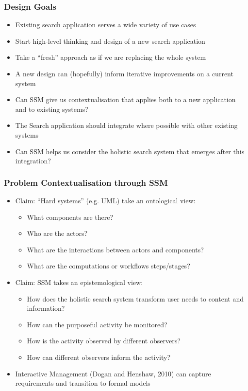 \documentclass{beamer}
\begin{document}
\begin{frame}
  \frametitle{Design Goals}
  \begin{itemize}
    \pause \item Existing search application serves a wide variety of use cases
    \pause \item Start high-level thinking and design of a new search application
    \pause \item Take a ``fresh'' approach as if we are replacing the whole system
    \pause \item A new design can (hopefully) inform iterative improvements on a current system
    \pause \item Can SSM give us contextualisation that applies both to a new application and to existing systems?
    \pause \item The Search application should integrate where possible with other existing systems
    \pause \item Can SSM helps us consider the holistic search system that emerges after this integration?
  \end{itemize}
\end{frame}

\begin{frame}
  \frametitle{Problem Contextualisation through SSM}
  \begin{itemize}
    \pause \item Claim: ``Hard systems'' (e.g. UML) take an ontological view:
    \begin{itemize}
      \pause \item What components are there?
      \pause \item Who are the actors?
      \pause \item What are the interactions between actors and components?
      \pause \item What are the computations or workflows steps/stages?
    \end{itemize}
    \pause \item Claim: SSM takes an epistemological view:
    \begin{itemize}
      \pause \item How does the holistic search system transform user needs to content and information?
      \pause \item How can the purposeful activity be monitored?
      \pause \item How is the activity observed by different observers?
      \pause \item How can different observers inform the activity?
    \end{itemize}
    \pause \item Interactive Management (Dogan and Henshaw, 2010) can capture requirements and transition to formal models
  \end{itemize}
\end{frame}
\end{document}
